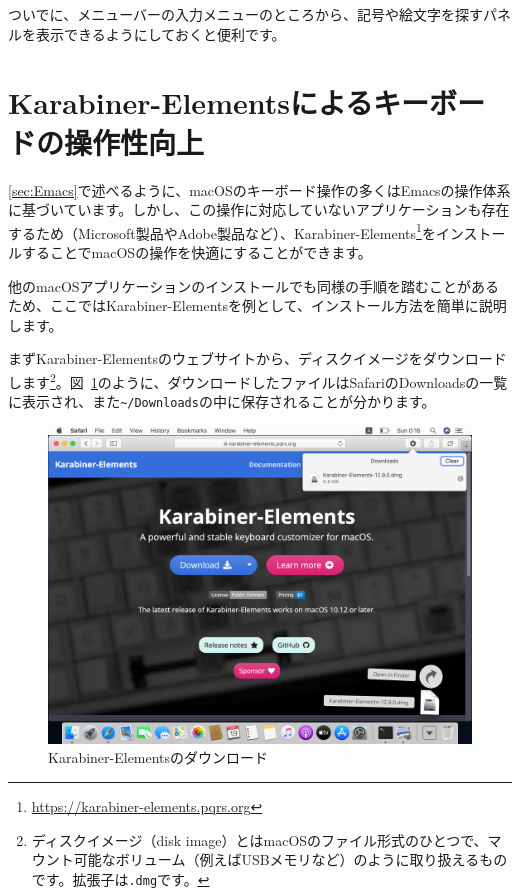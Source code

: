 ついでに、メニューバーの入力メニューのところから、記号や絵文字を探すパネルを表示できるようにしておくと便利です。

\section{Karabiner-Elementsによるキーボードの操作性向上}
\label{sec:Karabiner}

\ref{sec:Emacs}で述べるように、macOSのキーボード操作の多くはEmacsの操作体系に基づいています。しかし、この操作に対応していないアプリケーションも存在するため（Microsoft製品やAdobe製品など）、Karabiner-Elements\footnote{\url{https://karabiner-elements.pqrs.org}}をインストールすることでmacOSの操作を快適にすることができます。

他のmacOSアプリケーションのインストールでも同様の手順を踏むことがあるため、ここではKarabiner-Elementsを例として、インストール方法を簡単に説明します。

まずKarabiner-Elementsのウェブサイトから、ディスクイメージをダウンロードします\footnote{ディスクイメージ（disk image）とはmacOSのファイル形式のひとつで、マウント可能なボリューム（例えばUSBメモリなど）のように取り扱えるものです。拡張子は\texttt{.dmg}です。}。図~\ref{fig:Karabiner_download}のように、ダウンロードしたファイルはSafariのDownloadsの一覧に表示され、また\texttt{\~{}/Downloads}の中に保存されることが分かります。

\begin{figure}
  \centering
  \includegraphics[scale=0.35]{fig/Karabiner_download.png}
  \caption{Karabiner-Elementsのダウンロード}
  \label{fig:Karabiner_download}
\end{figure}

